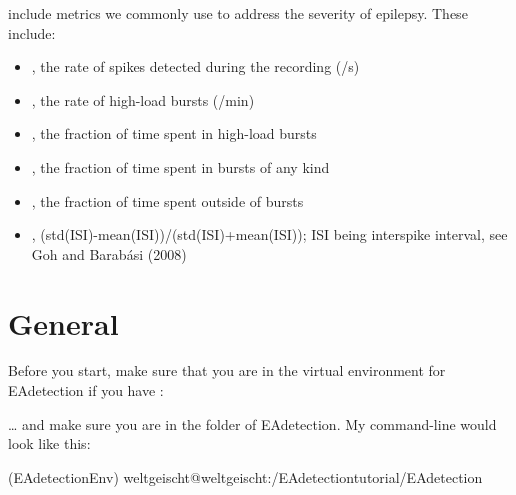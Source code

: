 \documentclass[letterpaper,10pt,english]{sphinxmanual}
\begin{document}
 include metrics we commonly use to address the severity of epilepsy. These include:
\begin{itemize}
\item {} 
, the rate of spikes detected during the recording (/s)

\item {} 
, the rate of high-load bursts (/min)

\item {} 
, the fraction of time spent in high-load bursts

\item {} 
, the fraction of time spent in bursts of any kind

\item {} 
, the fraction of time spent outside of bursts

\item {} 
, (std(ISI)-mean(ISI))/(std(ISI)+mean(ISI)); ISI being interspike interval, see Goh and Barabási (2008)

\end{itemize}


\section{General}
\label{\detokenize{access_metadata:general}}
Before you start, make sure that you are in the virtual environment for EAdetection if you have {\hyperref[\detokenize{getting_started:virtual-env}]{}}:

%
\begin{sphinxVerbatim}[commandchars=\\\{\}]
  
\end{sphinxVerbatim}

… and make sure you are in the folder of EAdetection. My command-line would look like this:

%
\begin{sphinxVerbatim}[commandchars=\\\{\}]
(EAdetectionEnv) weltgeischt@weltgeischt:\PYGZti{}/EAdetection\PYGZus{}tutorial/EAdetection\PYGZdl{}
\end{sphinxVerbatim}
\end{document}
